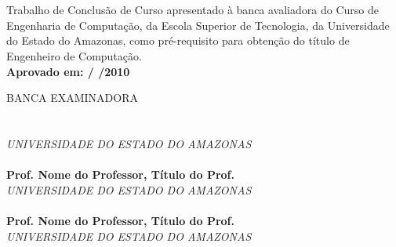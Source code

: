 
\begin{center}
\bf \MakeUppercase{\nome}\\[1.5 cm]
\end{center}

\begin{center}
\bf \MakeUppercase{\titulo}\\[1.5cm]
\end{center}

\hspace*{8cm}
\begin{minipage}{8cm} 

Trabalho de Conclusão de Curso apresentado à 
banca avaliadora do Curso de Engenharia de Computação, 
da Escola Superior de Tecnologia, da Universidade do Estado do Amazonas, 
como pré-requisito para obtenção do título de 
Engenheiro de Computação.\\

\large \bf Aprovado em:  /  /2010
\end{minipage} 

BANCA EXAMINADORA\\[12 pt]

\noindent \hrulefill \hspace*{6cm} \\
\noindent \textbf{\orientador}\\
\textit{UNIVERSIDADE DO ESTADO DO AMAZONAS}\\[0.5cm]

\noindent \hrulefill \hspace*{6cm} \\
\noindent \textbf{Prof. Nome do Professor, Título do Prof.}\\
\textit{UNIVERSIDADE DO ESTADO DO AMAZONAS}\\[0.5cm]

\noindent \hrulefill \hspace*{6cm} \\
\noindent \textbf{Prof. Nome do Professor, Título do Prof.}\\
\textit{UNIVERSIDADE DO ESTADO DO AMAZONAS}\\
